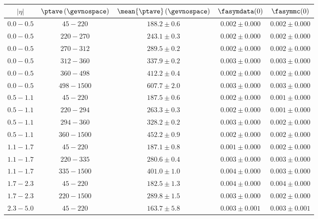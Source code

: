 \begin{table}[!htb]
  \begin{center}
    \begin{tabular}{ccccc}
      \toprule
      $|\eta|$ & $\ptave \,(\gevnospace)$ & $\mean{\ptave} \,(\gevnospace)$ & $\fasymdata(0)$ & $\fasymmc(0)$ \\ 
      \midrule 
      $0.0 - 0.5$ & $45 - 220$ & $188.2 \pm 0.6$ & $0.002 \pm 0.000$ & $0.002 \pm 0.000$ \\ 
      $0.0 - 0.5$ & $220 - 270$ & $243.1 \pm 0.3$ & $0.002 \pm 0.000$ & $0.002 \pm 0.000$ \\ 
      $0.0 - 0.5$ & $270 - 312$ & $289.5 \pm 0.2$ & $0.002 \pm 0.000$ & $0.002 \pm 0.000$ \\ 
      $0.0 - 0.5$ & $312 - 360$ & $337.9 \pm 0.2$ & $0.003 \pm 0.000$ & $0.003 \pm 0.000$ \\ 
      $0.0 - 0.5$ & $360 - 498$ & $412.2 \pm 0.4$ & $0.002 \pm 0.000$ & $0.002 \pm 0.000$ \\ 
      $0.0 - 0.5$ & $498 - 1500$ & $607.7 \pm 2.0$ & $0.003 \pm 0.000$ & $0.003 \pm 0.000$ \\ 
      \midrule
      $0.5 - 1.1$ & $45 - 220$ & $187.5 \pm 0.6$ & $0.002 \pm 0.000$ & $0.001 \pm 0.000$ \\ 
      $0.5 - 1.1$ & $220 - 294$ & $263.3 \pm 0.3$ & $0.002 \pm 0.000$ & $0.001 \pm 0.000$ \\ 
      $0.5 - 1.1$ & $294 - 360$ & $328.2 \pm 0.2$ & $0.003 \pm 0.000$ & $0.002 \pm 0.000$ \\ 
      $0.5 - 1.1$ & $360 - 1500$ & $452.2 \pm 0.9$ & $0.002 \pm 0.000$ & $0.002 \pm 0.000$ \\ 
      \midrule
      $1.1 - 1.7$ & $45 - 220$ & $187.1 \pm 0.8$ & $0.001 \pm 0.000$ & $0.002 \pm 0.000$ \\ 
      $1.1 - 1.7$ & $220 - 335$ & $280.6 \pm 0.4$ & $0.003 \pm 0.000$ & $0.003 \pm 0.000$ \\ 
      $1.1 - 1.7$ & $335 - 1500$ & $401.0 \pm 1.0$ & $0.004 \pm 0.000$ & $0.003 \pm 0.000$ \\ 
      \midrule
      $1.7 - 2.3$ & $45 - 220$ & $182.5 \pm 1.3$ & $0.004 \pm 0.000$ & $0.004 \pm 0.000$ \\ 
      $1.7 - 2.3$ & $220 - 1500$ & $289.8 \pm 1.5$ & $0.003 \pm 0.000$ & $0.002 \pm 0.000$ \\ 
      \midrule
      $2.3 - 5.0$ & $45 - 220$ & $163.7 \pm 5.8$ & $0.003 \pm 0.001$ & $0.003 \pm 0.001$ \\ 
      \bottomrule
    \end{tabular}
  \end{center}
\end{table}

